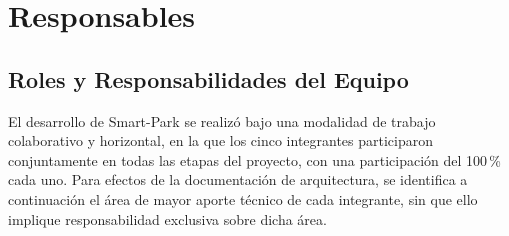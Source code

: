 
\section{Responsables}

\subsection{Roles y Responsabilidades del Equipo}

El desarrollo de Smart-Park se realizó bajo una modalidad de trabajo colaborativo y horizontal, en la que los cinco integrantes participaron conjuntamente en todas las etapas del proyecto, con una participación del 100\,\% cada uno. Para efectos de la documentación de arquitectura, se identifica a continuación el área de mayor aporte técnico de cada integrante, sin que ello implique responsabilidad exclusiva sobre dicha área.

